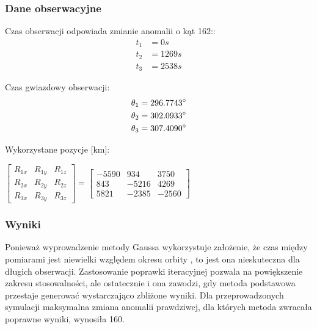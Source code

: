      \subsubsection{Dane obserwacyjne}

    Czas obserwacji odpowiada zmianie anomalii o kąt 162:\degree: 
        \begin{align*}
            t_{1} &= 0 s \\
            t_{2} &= 1269 s  \\
            t_{3} &= 2538 s
        \end{align*}    
        
    Czas gwiazdowy obserwacji: 
        \begin{align*}
            \theta_1 &= 296.7743\degree \\
            \theta_2 &= 302.0933\degree  \\
            \theta_3 &= 307.4090\degree
        \end{align*}

    Wykorzystane pozycje [km]: 
   
            \begin{center}
              $\begin{bmatrix}
                R_{1x} & R_{1y} & R_{1z} \\
                R_{2x} & R_{2y} & R_{2z} \\
                R_{3x} & R_{3y} & R_{3z} 
            \end{bmatrix}
            =
            \begin{bmatrix}
                -5590 & 934 & 3750 \\
                843 & -5216 & 4269 \\
                5821 & -2385 & -2560
            \end{bmatrix}    $
        \end{center}

    
    \subsubsection{Wyniki}
    Ponieważ wyprowadzenie metody Gaussa wykorzystuje założenie, że czas między pomiarami jest niewielki względem okresu orbity \cite{Curtis2013}, to jest ona nieskuteczna dla długich obserwacji. Zastosowanie poprawki iteracyjnej pozwala na powiększenie zakresu stosowalności, ale ostatecznie i ona zawodzi, gdy metoda podstawowa przestaje generować wystarczająco zbliżone wyniki. Dla przeprowadzonych symulacji maksymalna zmiana anomalii prawdziwej, dla których metoda zwracała poprawne wyniki, wynosiła 160\degree. 

